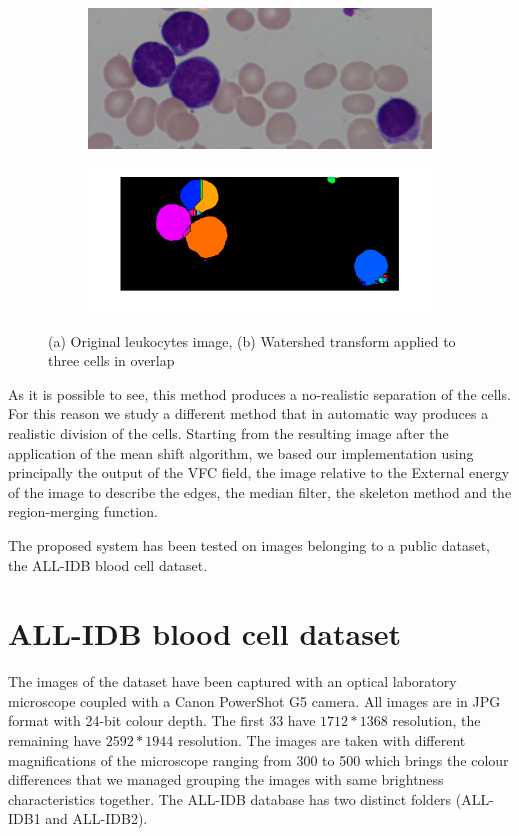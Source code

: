 \begin{figure}
	\centering
	\begin{subfigure}[b]{0.5\textwidth}
        \includegraphics[width=\textwidth]{img/Im007_1_crop.png}
        \caption{ }
        \label{fig:origimage}
    \end{subfigure}
    \begin{subfigure}[b]{0.5\textwidth}
		\includegraphics[width=\textwidth]{img/waterTrRes.png}
		\caption{ }
		\label{fig:watershedoncells}
	\end{subfigure}
	\caption{(a) Original leukocytes image, (b) Watershed transform applied to three cells in overlap}
	\label{fig:exOnImage7}
\end{figure}
As it is possible to see, this method produces a no-realistic separation of the cells. For this reason we study a different method that in automatic way produces a realistic division of the cells. Starting from the resulting image after the application of the mean shift algorithm, we based our implementation using principally the output of the VFC field, the image relative to the External energy of the image to describe the edges, the median filter, the skeleton method and the region-merging function.

\bigskip
The proposed system has been tested on images belonging to a public dataset, the ALL-IDB blood cell dataset.

\section{ALL-IDB blood cell dataset}
The images of the dataset have been captured with an optical laboratory microscope coupled with
a Canon PowerShot G5 camera. All images are in JPG format with 24-bit colour depth. The first 33
have $1712*1368$ resolution, the remaining have $2592*1944$ resolution. The images are taken with
different magnifications of the microscope ranging from 300 to 500 which brings the colour
differences that we managed grouping the images with same brightness characteristics together. The
ALL-IDB database has two distinct folders (ALL-IDB1 and ALL-IDB2).

